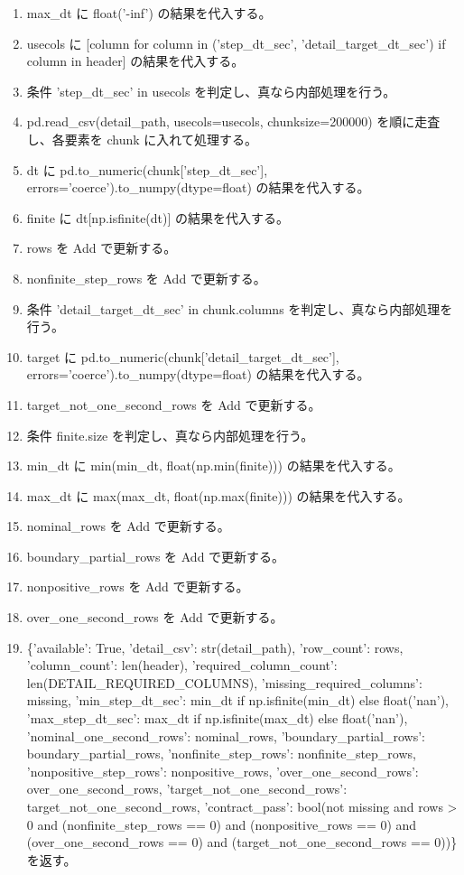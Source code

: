 \documentclass[a4paper,11pt]{article}
\begin{document}
\begin{enumerate}[leftmargin=1.8em]
\item max\_dt に float('-inf') の結果を代入する。
\item usecols に [column for column in ('step\_dt\_sec', 'detail\_target\_dt\_sec') if column in header] の結果を代入する。
\item 条件 'step\_dt\_sec' in usecols を判定し、真なら内部処理を行う。
\item   pd.read\_csv(detail\_path, usecols=usecols, chunksize=200000) を順に走査し、各要素を chunk に入れて処理する。
\item     dt に pd.to\_numeric(chunk['step\_dt\_sec'], errors='coerce').to\_numpy(dtype=float) の結果を代入する。
\item     finite に dt[np.isfinite(dt)] の結果を代入する。
\item     rows を Add で更新する。
\item     nonfinite\_step\_rows を Add で更新する。
\item     条件 'detail\_target\_dt\_sec' in chunk.columns を判定し、真なら内部処理を行う。
\item       target に pd.to\_numeric(chunk['detail\_target\_dt\_sec'], errors='coerce').to\_numpy(dtype=float) の結果を代入する。
\item       target\_not\_one\_second\_rows を Add で更新する。
\item     条件 finite.size を判定し、真なら内部処理を行う。
\item       min\_dt に min(min\_dt, float(np.min(finite))) の結果を代入する。
\item       max\_dt に max(max\_dt, float(np.max(finite))) の結果を代入する。
\item       nominal\_rows を Add で更新する。
\item       boundary\_partial\_rows を Add で更新する。
\item       nonpositive\_rows を Add で更新する。
\item       over\_one\_second\_rows を Add で更新する。
\item \{'available': True, 'detail\_csv': str(detail\_path), 'row\_count': rows, 'column\_count': len(header), 'required\_column\_count': len(DETAIL\_REQUIRED\_COLUMNS), 'missing\_required\_columns': missing, 'min\_step\_dt\_sec': min\_dt if np.isfinite(min\_dt) else float('nan'), 'max\_step\_dt\_sec': max\_dt if np.isfinite(max\_dt) else float('nan'), 'nominal\_one\_second\_rows': nominal\_rows, 'boundary\_partial\_rows': boundary\_partial\_rows, 'nonfinite\_step\_rows': nonfinite\_step\_rows, 'nonpositive\_step\_rows': nonpositive\_rows, 'over\_one\_second\_rows': over\_one\_second\_rows, 'target\_not\_one\_second\_rows': target\_not\_one\_second\_rows, 'contract\_pass': bool(not missing and rows > 0 and (nonfinite\_step\_rows == 0) and (nonpositive\_rows == 0) and (over\_one\_second\_rows == 0) and (target\_not\_one\_second\_rows == 0))\} を返す。
            \end{enumerate}
\end{document}

